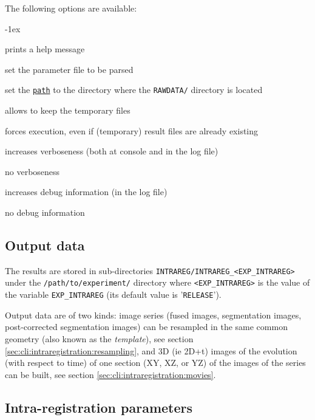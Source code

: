 The following options are available:
\begin{description}
  \itemsep -1ex
\item[\texttt{-h}] prints a help message
\item[\texttt{-p \underline{file}}] set the parameter file to be parsed
\item[\texttt{-e \underline{path}}] set the
  \texttt{\underline{path}} to the directory where the
  \texttt{RAWDATA/} directory is located
\item[\texttt{-k}] allows to keep the temporary files
\item[\texttt{-f}] forces execution, even if (temporary) result files
  are already existing
\item[\texttt{-v}] increases verboseness (both at console and in the
  log file)
\item[\texttt{-nv}] no verboseness
\item[\texttt{-d}]  increases debug information (in the
  log file)
\item[\texttt{-nd}] no debug information
\end{description}


\subsection{Output data}

The results are stored in sub-directories
\texttt{INTRAREG/INTRAREG\_<EXP\_INTRAREG>} under the
\texttt{/path/to/experiment/} directory where \texttt{<EXP\_INTRAREG>} is the value of the variable \texttt{EXP\_INTRAREG} (its
default value is '\texttt{RELEASE}'). 

\mbox{}
\mbox{}

Output data are of two kinds: image series (fused images, segmentation
images, post-corrected segmentation images) can be resampled in the
same common geometry (also known as the \textit{template}), see
section \ref{sec:cli:intraregistration:resampling}, and 3D (ie 2D+t)
images of the evolution (with respect to time) of one section (XY, XZ,
or YZ) of the images of the series can be built, see
section \ref{sec:cli:intraregistration:movies}.




\subsection{Intra-registration parameters}

